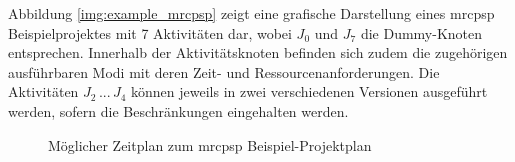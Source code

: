 Abbildung \ref{img:example_mrcpsp} zeigt eine grafische Darstellung eines \ac{mrcpsp} Beispielprojektes mit 7 Aktivitäten dar, wobei $J_0$ und $J_7$ die Dummy-Knoten entsprechen. Innerhalb der Aktivitätsknoten befinden sich zudem die zugehörigen ausführbaren Modi mit deren Zeit- und Ressourcenanforderungen. Die Aktivitäten $J_2 \, ... \, J_4$ können jeweils in zwei verschiedenen Versionen ausgeführt werden, sofern die Beschränkungen eingehalten werden. \\

\begin{figure}[H]
    \centering
    \noindent{}
    \caption{Möglicher Zeitplan zum \ac{mrcpsp} Beispiel-Projektplan} 
    \label{img:example_mrcpsp_schedule}
\end{figure}

